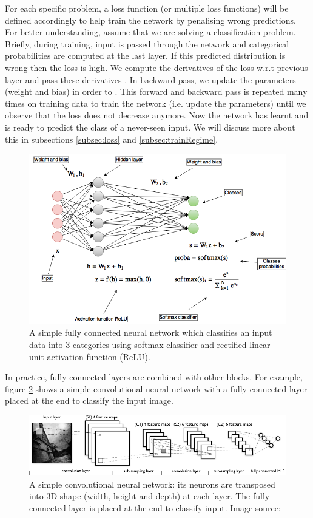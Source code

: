 For each specific problem, a loss function (or multiple loss functions) will be defined accordingly to help train the network by penalising wrong predictions. For better understanding, assume that we are solving a classification problem. Briefly, during training, input is passed  through the network and categorical probabilities are computed at the last layer. If this predicted distribution is wrong then the loss is high. We compute the derivatives of the loss w.r.t previous layer and pass these derivatives . In backward pass, we update the parameters (weight and bias) in order to . This forward and backward pass is repeated many times on training data to train the network (i.e. update the parameters) until we observe that the loss does not decrease anymore. Now the network has learnt and is ready to predict the class of a never-seen input. We will discuss more about this in subsections \ref{subsec:loss} and \ref{subsec:trainRegime}. 
\begin{figure}[tb]
	\centering
	\includegraphics[width=0.9\hsize]{./figures/fcNet}
	\caption{A simple fully connected neural network which classifies an input data into 3 categories using softmax classifier and rectified linear unit activation function (ReLU).}
	\label{fig:fcNet}
\end{figure}
In practice, fully-connected layers are combined with other blocks. For example, figure \ref{fig:convNet1} shows a simple convolutional neural network with a fully-connected layer placed at the end to classify the input image.
\begin{figure}[tb]
	\centering
	\includegraphics[width=0.9\hsize]{./figures/convNet1}
	\caption{A simple convolutional neural network: its neurons are transposed into 3D shape (width, height and depth) at each layer. The fully connected layer is placed at the end to classify input. Image source: \cite{deeplearningTut}}
	\label{fig:convNet1}
\end{figure}
